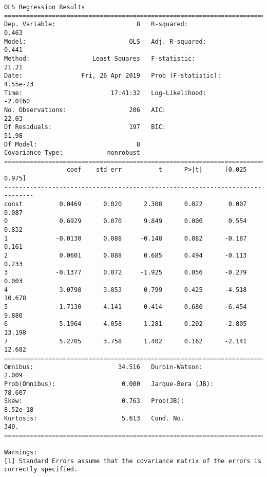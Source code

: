 \documentclass[11pt]{article}
\begin{document}
    \begin{Verbatim}[commandchars=\\\{\}]
                            OLS Regression Results                            
==============================================================================
Dep. Variable:                      8   R-squared:                       0.463
Model:                            OLS   Adj. R-squared:                  0.441
Method:                 Least Squares   F-statistic:                     21.21
Date:                Fri, 26 Apr 2019   Prob (F-statistic):           4.55e-23
Time:                        17:41:32   Log-Likelihood:                -2.0160
No. Observations:                 206   AIC:                             22.03
Df Residuals:                     197   BIC:                             51.98
Df Model:                           8                                         
Covariance Type:            nonrobust                                         
==============================================================================
                 coef    std err          t      P>|t|      [0.025      0.975]
------------------------------------------------------------------------------
const          0.0469      0.020      2.308      0.022       0.007       0.087
0              0.6929      0.070      9.849      0.000       0.554       0.832
1             -0.0130      0.088     -0.148      0.882      -0.187       0.161
2              0.0601      0.088      0.685      0.494      -0.113       0.233
3             -0.1377      0.072     -1.925      0.056      -0.279       0.003
4              3.0798      3.853      0.799      0.425      -4.518      10.678
5              1.7130      4.141      0.414      0.680      -6.454       9.880
6              5.1964      4.058      1.281      0.202      -2.805      13.198
7              5.2705      3.758      1.402      0.162      -2.141      12.682
==============================================================================
Omnibus:                       34.516   Durbin-Watson:                   2.009
Prob(Omnibus):                  0.000   Jarque-Bera (JB):               78.607
Skew:                           0.763   Prob(JB):                     8.52e-18
Kurtosis:                       5.613   Cond. No.                         340.
==============================================================================

Warnings:
[1] Standard Errors assume that the covariance matrix of the errors is correctly specified.

    \end{Verbatim}
\end{document}
